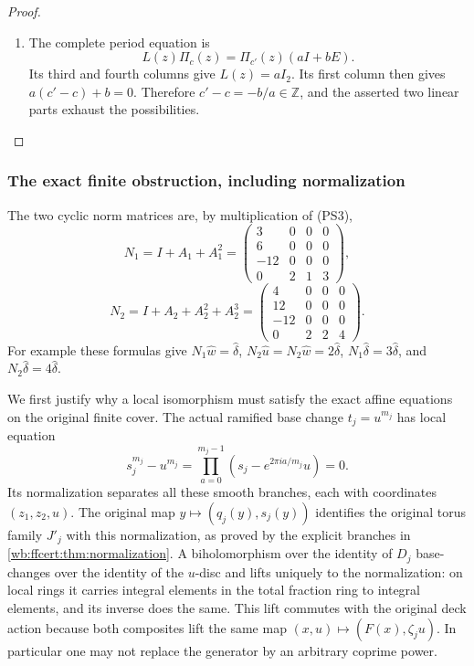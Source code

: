 \begin{proof}
\begin{enumerate}[label=\arabic*.,leftmargin=*]
\item The complete period equation is
\[
                   L(z)\Pi_c(z)=\Pi_{c'}(z)(aI+bE).
 \tag{PS8}\label{wb:pshift:eq:period-morphism}
\]
Its third and fourth columns give $L(z)=aI_2$. Its first column
then gives $a(c'-c)+b=0$. Therefore $c'-c=-b/a\in\mathbb Z$,
and the asserted two linear parts exhaust the possibilities.
\end{enumerate}
\end{proof}

\subsubsection{The exact finite obstruction, including normalization}

The two cyclic norm matrices are, by multiplication of (PS3),
\[
 N_1=I+A_1+A_1^2=
 \begin{pmatrix}3&0&0&0\\6&0&0&0\\-12&0&0&0\\0&2&1&3\end{pmatrix},
\]
\[
 N_2=I+A_2+A_2^2+A_2^3=
 \begin{pmatrix}4&0&0&0\\12&0&0&0\\-12&0&0&0\\0&2&2&4\end{pmatrix}.
 \tag{PS9}\label{wb:pshift:eq:norms}
\]
For example these formulas give
$N_1\widehat w=\widehat\delta$,
$N_2\widehat u=N_2\widehat w=2\widehat\delta$,
$N_1\widehat\delta=3\widehat\delta$, and
$N_2\widehat\delta=4\widehat\delta$.

We first justify why a local isomorphism must satisfy the exact affine
equations on the original finite cover. The actual ramified base change
$t_j=u^{m_j}$ has local equation
\[
 s_j^{m_j}-u^{m_j}
   =\prod_{a=0}^{m_j-1}(s_j-e^{2\pi ia/m_j}u)=0.
\]
Its normalization separates all these smooth branches, each with
coordinates $(z_1,z_2,u)$. The original map
$y\mapsto(q_j(y),s_j(y))$ identifies the original torus family $J'_j$
with this normalization, as proved by the explicit branches in
\cref{wb:ffcert:thm:normalization}. A biholomorphism over the identity of
$D_j$ base-changes over the identity of the $u$-disc and lifts uniquely
to the normalization: on local rings it carries integral elements in
the total fraction ring to integral elements, and its inverse does
the same. This lift commutes with the original deck action because
both composites lift the same map $(x,u)\mapsto(F(x),\zeta_j u)$.
In particular one may not replace the generator by an arbitrary
coprime power.

